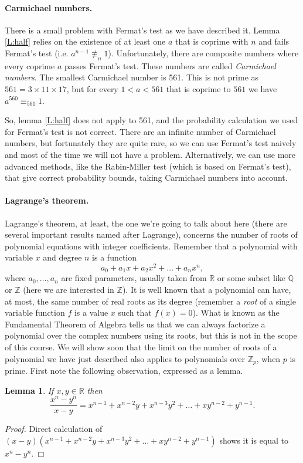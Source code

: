 \documentclass{article}
\theoremstyle{plain}
\newtheorem{lemma}[theorem]{Lemma}{\bfseries}{\upshape}
\newcommand{\bZ}{\mathbb{Z}}
\newcommand{\bQ}{\mathbb{Q}}
\newcommand{\bR}{\mathbb{R}}
\begin{document}
\paragraph{Carmichael numbers.}
There is a small problem with Fermat's test as we have described it. Lemma \ref{L:half} relies on the existence of at least one $a$ that is coprime with $n$ and fails Fermat's test (i.e. $a^{n-1}\not\equiv_n 1$). Unfortunately, there are composite numbers where every coprime $a$ passes Fermat's test. These numbers are called \emph{Carmichael numbers}. The smallest Carmichael number is 561. This is not prime as $561 = 3\times 11 \times 17$, but for every $1<a<561$ that is coprime to $561$ we have $a^{560}\equiv_{561} 1$. 

So, lemma \ref{L:half} does not apply to 561, and the probability calculation we used for Fermat's test is not correct. There are an infinite number of Carmichael numbers, but fortunately they are quite rare, so we can use Fermat's test naively and most of the time we will not have a problem. Alternatively, we can use more advanced methods, like the Rabin-Miller test (which is based on Fermat's test), that give correct probability bounds, taking Carmichael numbers into account.          

\paragraph{Lagrange's theorem.}
Lagrange's theorem, at least, the one we're going to talk about here (there are several important results named after Lagrange), concerns the number of roots of polynomial equations with integer coefficients. Remember that a polynomial with variable $x$ and degree $n$ is a function 
\[a_0 +a_1x +a_2x^2+\ldots +a_nx^n,\] 
where $a_0,\ldots,a_n$ are fixed parameters, usually taken from $\bR$ or some subset like $\bQ$ or $\bZ$ (here we are interested in $\bZ$). It is well known that a polynomial can have, at most, the same number of real roots as its degree (remember a \emph{root} of a single variable function $f$ is a value $x$ such that $f(x)=0$). What is known as the Fundamental Theorem of Algebra tells us that we can always factorize a polynomial over the complex numbers using its roots, but this is not in the scope of this course. We will show soon that the limit on the number of roots of a polynomial we have just described also applies to polynomials over $\bZ_p$, when $p$ is prime. First note the following observation, expressed as a lemma.
  
\begin{lemma}\label{L:Lagdiv}
If $x,y\in\bR$ then 
\[\frac{x^n-y^n}{x-y} = x^{n-1} + x^{n-2}y + x^{n-3}y^2 + \ldots + x y^{n-2} + y^{n-1}.\]
\end{lemma}
\begin{proof}
Direct calculation of $(x-y)(x^{n-1} + x^{n-2}y + x^{n-3}y^2 + \ldots + x y^{n-2} + y^{n-1})$ shows it is equal to $x^n-y^n$.
\end{proof}
\end{document}
